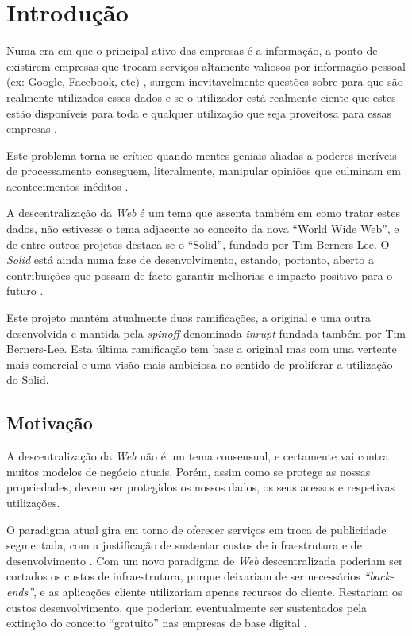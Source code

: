 \chapter{Introdução}
\label{cap:1}

Numa era em que o principal ativo das empresas é a informação, a ponto de existirem empresas que trocam serviços altamente valiosos por informação pessoal (ex: Google, Facebook, etc) \cite{top_three_issues_centralized_web}, surgem inevitavelmente questões sobre para que são realmente utilizados esses dados e se o utilizador está realmente ciente que estes estão disponíveis para toda e qualquer utilização que seja proveitosa para essas empresas \cite{facebook_data_hell_medium}.

Este problema torna-se crítico quando mentes geniais aliadas a poderes incríveis de processamento conseguem, literalmente, manipular opiniões que culminam em acontecimentos inéditos \cite{cambridge_analytica}.

A descentralização da \emph{Web} é um tema que assenta também em como tratar estes dados, não estivesse o tema adjacente ao conceito da nova “World Wide Web”, e de entre outros projetos destaca-se o “Solid”, fundado por Tim Berners-Lee. O \emph{Solid} está ainda numa fase de desenvolvimento, estando, portanto, aberto a contribuições que possam de facto garantir melhorias e impacto positivo para o futuro \cite{why_web_decentralization_future}.

Este projeto mantém atualmente duas ramificações, a original e uma outra desenvolvida e mantida pela \emph{spinoff} denominada \emph{inrupt} fundada também por Tim Berners-Lee. Esta última ramificação tem base a original mas com uma vertente mais comercial e uma visão mais ambiciosa no sentido de proliferar a utilização do Solid.

\section{Motivação}
A descentralização da \emph{Web} não é um tema consensual, e certamente vai contra muitos modelos de negócio atuais. Porém, assim como se protege as nossas propriedades, devem ser protegidos os nossos dados, os seus acessos e respetivas utilizações.

O paradigma atual gira em torno de oferecer serviços em troca de publicidade segmentada, com a justificação de sustentar custos de infraestrutura e de desenvolvimento \cite{top_three_issues_centralized_web}. Com um novo paradigma de \emph{Web} descentralizada poderiam ser cortados os custos de infraestrutura, porque deixariam de ser necessários \emph{“back-ends”}, e as aplicações cliente utilizariam apenas recursos do cliente. Restariam os custos desenvolvimento, que poderiam eventualmente ser sustentados pela extinção do conceito “gratuito” nas empresas de base digital \cite{why_web_decentralization_future}.


